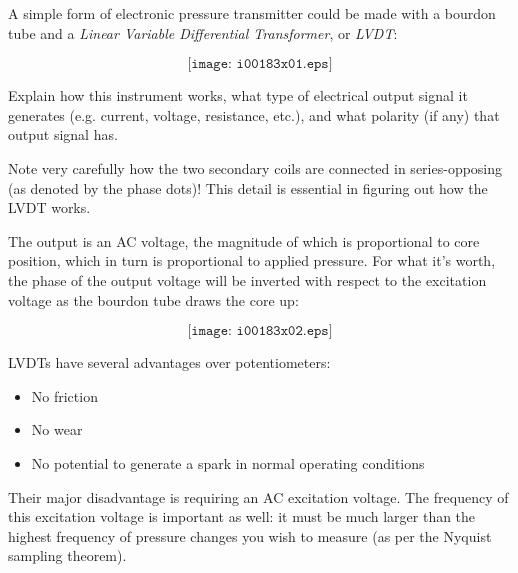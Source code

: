 

A simple form of electronic pressure transmitter could be made with a bourdon tube and a {\it Linear Variable Differential Transformer}, or {\it LVDT}:

$$\texttt{[image: i00183x01.eps]}$$

Explain how this instrument works, what type of electrical output signal it generates (e.g. current, voltage, resistance, etc.), and what polarity (if any) that output signal has.







Note very carefully how the two secondary coils are connected in series-opposing (as denoted by the phase dots)!  This detail is essential in figuring out how the LVDT works.

\vskip 10pt

The output is an AC voltage, the magnitude of which is proportional to core position, which in turn is proportional to applied pressure.  For what it's worth, the phase of the output voltage will be inverted with respect to the excitation voltage as the bourdon tube draws the core up:

$$\texttt{[image: i00183x02.eps]}$$

LVDTs have several advantages over potentiometers:

\begin{itemize}
\item{} No friction
\item{} No wear
\item{} No potential to generate a spark in normal operating conditions
\end{itemize}

Their major disadvantage is requiring an AC excitation voltage.  The frequency of this excitation voltage is important as well: it must be much larger than the highest frequency of pressure changes you wish to measure (as per the Nyquist sampling theorem).










